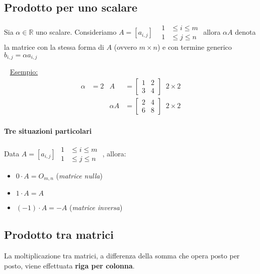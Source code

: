 \documentclass[11pt,oneside]{book}
\begin{document}
\subsection{Prodotto per uno scalare}
Sia $\alpha \in \mathbb{R}$ uno scalare.
Consideriamo $A=[a_{i,j}]\;\;\; \begin{aligned} 1&\le i\le m\\ 1&\le j\le n \end{aligned}$
allora $\alpha A$ denota la matrice con la stessa forma di $A$ (ovvero $m \times n$) e con
termine generico $b_{i,j} = \alpha a_{i,j}$

~\newline
\underline{Esempio:}
\begin{align*}
    \alpha   & = 2                                          & A & = \begin{bmatrix}
        1 & 2 \\
        3 & 4
    \end{bmatrix} \;\; 2 \times 2 \\
             &                                              &
    \alpha A & = \begin{bmatrix}
        2 & 4 \\
        6 & 8
    \end{bmatrix} \;\; 2 \times 2
\end{align*}

\paragraph{Tre situazioni particolari} Data $A=[a_{i,j}]$ \tiny$\begin{aligned} 1&\le i\le m\\ 1&\le j\le n \end{aligned}$ \normalsize, allora:
\begin{itemize}
    \item $0 \cdot A = O_{m,n}$ (\emph{matrice nulla})
    \item $1 \cdot A = A$
    \item $(-1) \cdot A = -A$ (\emph{matrice inversa})
\end{itemize}

\subsection{Prodotto tra matrici}
La moltiplicazione tra matrici, a differenza della somma che opera posto per posto, viene effettuata \textbf{riga per colonna}.
\end{document}
